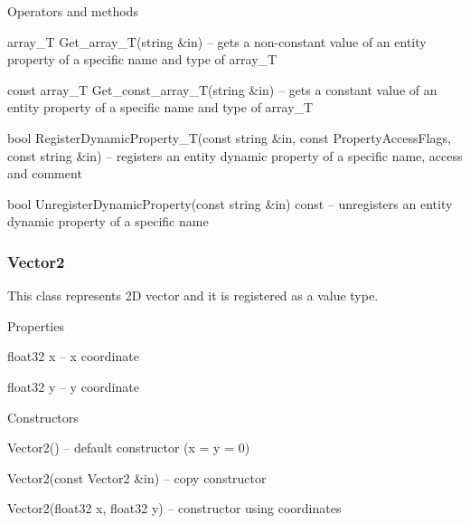 \begin{titled-itemize}{Operators and methods}
  \item array\_T Get\_array\_T(string \&in) -- gets a non-constant value of an entity property of a specific name and type of array\_T
  \item const array\_T Get\_const\_array\_T(string \&in) -- gets a constant value of an entity property of a specific name and type of array\_T
  \item bool RegisterDynamicProperty\_T(const string \&in, const PropertyAccessFlags, const string \&in) -- registers an entity dynamic property of a specific name, access and comment
  \item bool UnregisterDynamicProperty(const string \&in) const -- unregisters an entity dynamic property of a specific name
\end{titled-itemize}

\subsubsection{Vector2}

This class represents 2D vector and it is registered as a value type.

\begin{titled-itemize}{Properties}
  \item float32 x -- x coordinate
  \item float32 y -- y coordinate
\end{titled-itemize}

\begin{titled-itemize}{Constructors}
  \item Vector2() -- default constructor (x = y = 0)
  \item Vector2(const Vector2 \&in) -- copy constructor
  \item Vector2(float32 x, float32 y)  -- constructor using coordinates
\end{titled-itemize}

